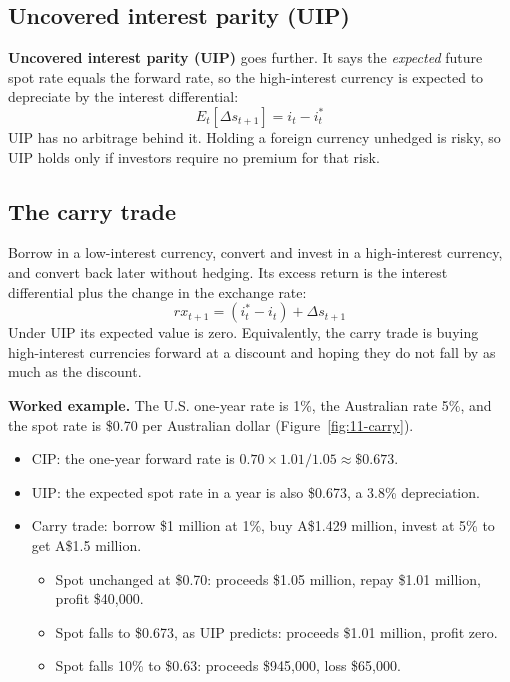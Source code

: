 \subsection{Uncovered interest parity (UIP)}

\textbf{Uncovered interest parity (UIP)} goes further. It says the \emph{expected} future spot rate equals the forward rate, so the high-interest currency is expected to depreciate by the interest differential:
\begin{equation}
  E_t[\Delta s_{t+1}] = i_t - i^*_t
  \label{eq:11-uip}
\end{equation}
UIP has no arbitrage behind it. Holding a foreign currency unhedged is risky, so UIP holds only if investors require no premium for that risk.

\subsection{The carry trade}

Borrow in a low-interest currency, convert and invest in a high-interest currency, and convert back later without hedging. Its excess return is the interest differential plus the change in the exchange rate:
\begin{equation}
  rx_{t+1} = (i^*_t - i_t) + \Delta s_{t+1}
  \label{eq:11-carry}
\end{equation}
Under UIP its expected value is zero. Equivalently, the carry trade is buying high-interest currencies forward at a discount and hoping they do not fall by as much as the discount.

\textbf{Worked example.} The U.S. one-year rate is 1\%, the Australian rate 5\%, and the spot rate is \$0.70 per Australian dollar (Figure~\ref{fig:11-carry}).

\begin{itemize}
  \item CIP: the one-year forward rate is $0.70 \times 1.01/1.05 \approx \$0.673$.
  \item UIP: the expected spot rate in a year is also \$0.673, a 3.8\% depreciation.
  \item Carry trade: borrow \$1 million at 1\%, buy A\$1.429 million, invest at 5\% to get A\$1.5 million.
  \begin{itemize}
    \item Spot unchanged at \$0.70: proceeds \$1.05 million, repay \$1.01 million, profit \$40,000.
    \item Spot falls to \$0.673, as UIP predicts: proceeds \$1.01 million, profit zero.
    \item Spot falls 10\% to \$0.63: proceeds \$945,000, loss \$65,000.
  \end{itemize}
\end{itemize}

